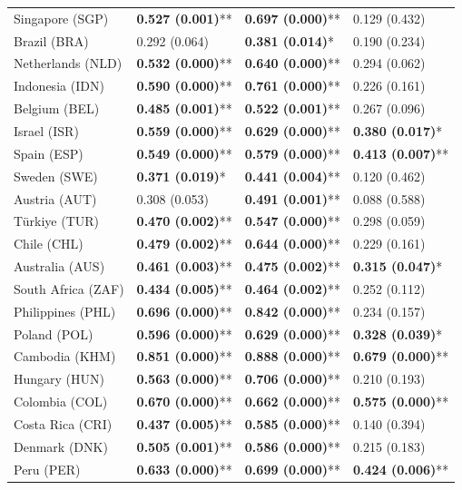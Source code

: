 \begin{longtable}{p{4cm}p{3cm}p{3cm}p{3cm}}
Singapore (SGP) & \textbf{0.527 (0.001)}** & \textbf{0.697 (0.000)}** & 0.129 (0.432) \\
Brazil (BRA) & 0.292 (0.064) & \textbf{0.381 (0.014)}* & 0.190 (0.234) \\
Netherlands (NLD) & \textbf{0.532 (0.000)}** & \textbf{0.640 (0.000)}** & 0.294 (0.062) \\
Indonesia (IDN) & \textbf{0.590 (0.000)}** & \textbf{0.761 (0.000)}** & 0.226 (0.161) \\
Belgium (BEL) & \textbf{0.485 (0.001)}** & \textbf{0.522 (0.001)}** & 0.267 (0.096) \\
Israel (ISR) & \textbf{0.559 (0.000)}** & \textbf{0.629 (0.000)}** & \textbf{0.380 (0.017)}* \\
Spain (ESP) & \textbf{0.549 (0.000)}** & \textbf{0.579 (0.000)}** & \textbf{0.413 (0.007)}** \\
Sweden (SWE) & \textbf{0.371 (0.019)}* & \textbf{0.441 (0.004)}** & 0.120 (0.462) \\
Austria (AUT) & 0.308 (0.053) & \textbf{0.491 (0.001)}** & 0.088 (0.588) \\
Türkiye (TUR) & \textbf{0.470 (0.002)}** & \textbf{0.547 (0.000)}** & 0.298 (0.059) \\
Chile (CHL) & \textbf{0.479 (0.002)}** & \textbf{0.644 (0.000)}** & 0.229 (0.161) \\
Australia (AUS) & \textbf{0.461 (0.003)}** & \textbf{0.475 (0.002)}** & \textbf{0.315 (0.047)}* \\
South Africa (ZAF) & \textbf{0.434 (0.005)}** & \textbf{0.464 (0.002)}** & 0.252 (0.112) \\
Philippines (PHL) & \textbf{0.696 (0.000)}** & \textbf{0.842 (0.000)}** & 0.234 (0.157) \\
Poland (POL) & \textbf{0.596 (0.000)}** & \textbf{0.629 (0.000)}** & \textbf{0.328 (0.039)}* \\
Cambodia (KHM) & \textbf{0.851 (0.000)}** & \textbf{0.888 (0.000)}** & \textbf{0.679 (0.000)}** \\
Hungary (HUN) & \textbf{0.563 (0.000)}** & \textbf{0.706 (0.000)}** & 0.210 (0.193) \\
Colombia (COL) & \textbf{0.670 (0.000)}** & \textbf{0.662 (0.000)}** & \textbf{0.575 (0.000)}** \\
Costa Rica (CRI) & \textbf{0.437 (0.005)}** & \textbf{0.585 (0.000)}** & 0.140 (0.394) \\
Denmark (DNK) & \textbf{0.505 (0.001)}** & \textbf{0.586 (0.000)}** & 0.215 (0.183) \\
Peru (PER) & \textbf{0.633 (0.000)}** & \textbf{0.699 (0.000)}** & \textbf{0.424 (0.006)}** \\

\end{longtable}
